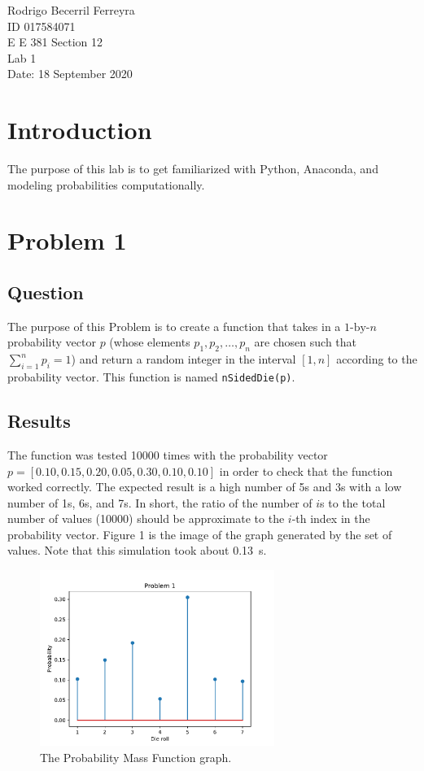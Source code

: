 \documentclass{article}
\renewcommand{\c}[1]{\texttt{#1}}
\begin{document}
    \noindent
    Rodrigo Becerril Ferreyra\\
    ID 017584071\\
    E E 381 Section 12\\
    Lab 1\\
    Date: 18 September 2020

\section*{Introduction} The purpose of this lab is to get
familiarized with Python, Anaconda, and modeling
probabilities computationally.

\section{Problem 1}
\subsection{Question} The purpose of this Problem is to
create a function that takes in a \(1\text{-by-}n\)
probability vector \(p\)
(whose elements \(p_1, p_2, \ldots , p_n\) are chosen such that
\(\sum_{i=1}^n p_i = 1\))
and return a random integer in the interval \([1, n]\)
according to the probability vector.
This function is named \c{nSidedDie(p)}.

\subsection{Results} The function was tested \num{10000}
times with the probability vector\\
\(p = [0.10, 0.15, 0.20, 0.05, 0.30, 0.10, 0.10]\)
in order to check that the function worked correctly.
The expected result is a high number of \num{5}s and
\num{3}s with a low number of \num{1}s, \num{6}s, and \num{7}s.
In short, the ratio of the number of \(i\)s to the total
number of values (\num{10000}) should be approximate to the \(i\)-th
index in the probability vector. Figure 1 is the image of
the graph generated by the set of values.
Note that this simulation took about \SI{0.13}{s}.

\begin{figure}[H]
    \centering
    \includegraphics[height=162pt]{Images/Problem1}
    \caption{The Probability Mass Function graph.}
    \label{prob1}
\end{figure}
\end{document}
